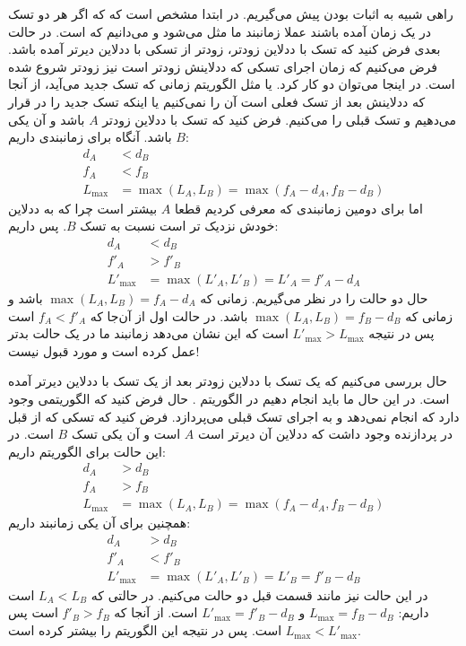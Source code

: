 \documentclass[]{article}
\begin{document}
\printheader

راهی شبیه به اثبات
بودن
پیش می‌گیریم. در ابتدا مشخص است که که اگر هر دو تسک در یک زمان آمده باشند عملا زمانبند ما مثل
می‌شود و می‌دانیم که
است. در حالت بعدی فرض کنید که تسک با ددلاین زودتر، زودتر از تسکی با ددلاین دیرتر آمده باشد.
فرض می‌کنیم که زمان اجرای تسکی که ددلاینش زودتر است نیز زودتر شروع شده است.
در اینجا می‌توان دو کار کرد. یا مثل الگوریتم
زمانی که تسک جدید می‌آید، از آنجا که ددلاینش بعد از تسک فعلی است آن را
نمی‌کنیم یا اینکه تسک جدید را در
قرار می‌دهیم و تسک قبلی را
می‌کنیم. فرض کنید که تسک با ددلاین زودتر
$A$
باشد و آن یکی $B$ باشد. آنگاه برای زمانبندی
داریم:
\begin{align*}
    d_A &< d_B\\
    f_A &< f_B\\
    L_{\text{max}} &= \max(L_{A}, L_{B}) = \max(f_A - d_A, f_B - d_B)
\end{align*}
اما برای دومین زمانبندی که معرفی کردیم قطعا
$A$
بیشتر است چرا که به ددلاین خودش نزدیک تر است نسبت به تسک
$B$.
پس داریم:
\begin{align*}
    d_A &< d_B\\
    f'_A &> f'_B\\
    L'_{\text{max}} &= \max(L'_{A}, L'_{B}) = L'_{A} = f'_A - d_A
\end{align*}
حال دو حالت را در نظر می‌گیریم. زمانی که
$\max(L_{A}, L_{B}) = f_A - d_A$
باشد و زمانی که
$\max(L_{A}, L_{B}) = f_B - d_B$
باشد. در حالت اول از آن‌جا که
$f_A < f'_A$
است پس در نتیجه
$L'_{\text{max}} > L_{\text{max}}$
است که این نشان می‌دهد زمانبند ما در یک حالت بدتر عمل کرده است و مورد قبول نیست!

حال بررسی می‌کنیم که یک تسک با ددلاین زودتر بعد از یک تسک با ددلاین دیرتر آمده است. در این حال ما باید
انجام دهیم در الگوریتم
. حال فرض کنید که الگوریتمی وجود دارد که
انجام نمی‌دهد و به اجرای تسک قبلی می‌پردازد. فرض کنید که تسکی که از قبل در پردازنده وجود داشت که ددلاین آن دیرتر است
$A$ است و آن یکی تسک $B$ است.
در این حالت برای الگوریتم
داریم:
\begin{align*}
    d_A &> d_B\\
    f_A &> f_B\\
    L_{\text{max}} &= \max(L_{A}, L_{B}) = \max(f_A - d_A, f_B - d_B)
\end{align*}
همچنین برای آن یکی زمانبند داریم:
\begin{align*}
    d_A &> d_B\\
    f'_A &< f'_B\\
    L'_{\text{max}} &= \max(L'_{A}, L'_{B}) = L'_B = f'_B - d_B
\end{align*}
در این حالت نیز مانند قسمت قبل دو حالت می‌کنیم. در حالتی که
$L_{A} < L_{B}$
است داریم:
$L_{\text{max}} = f_B - d_B$ و $L'_{\text{max}} = f'_B - d_B$
است. از آنجا که
$f'_B > f_B$
است پس
$L_{\text{max}} < L'_{\text{max}}$
است. پس در نتیجه این الگوریتم
را بیشتر کرده است.
\end{document}

